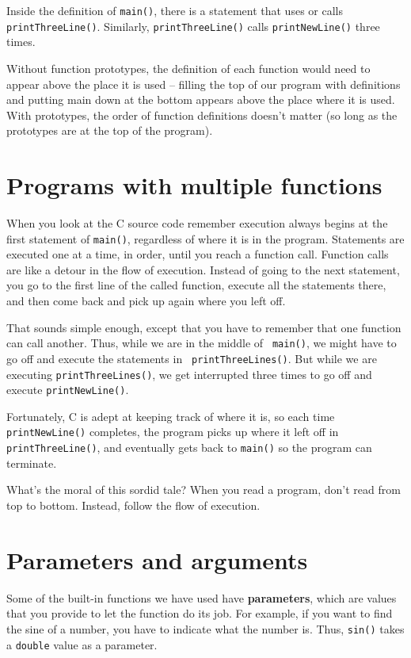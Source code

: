 Inside the definition of {\tt main()}, there is a statement that
uses or calls {\tt printThreeLine()}.  Similarly, {\tt printThreeLine()} calls
{\tt printNewLine()} three times.  

Without function prototypes,  the definition of each
function would need to appear above the place it is used -- filling the 
top of our program with definitions and putting main down at the bottom appears above the place where it is used. 
With prototypes, the order of function definitions doesn't matter (so long as the prototypes are at the top of the program).


\section {Programs with multiple functions}

When you look at the C source code remember execution always begins at the first statement of {\tt main()},
regardless of where it is in the program.
Statements are executed one at a time, in order, until you reach a
function call.  Function calls are like a detour in the flow of
execution.  Instead of going to the next statement, you go to the
first line of the called function, execute all the statements there,
and then come back and pick up again where you left off.

That sounds simple enough, except that you have to remember that one
function can call another.  Thus, while we are in the middle of {\tt
main()}, we might have to go off and execute the statements in {\tt
printThreeLines()}.  But while we are executing {\tt printThreeLines()}, we get
interrupted three times to go off and execute {\tt printNewLine()}.

Fortunately, C is adept at keeping track of where it is, so
each time {\tt printNewLine()} completes, the program picks up where it left
off in {\tt printThreeLine()}, and eventually gets back to {\tt main()} so the
program can terminate.

What's the moral of this sordid tale?  When you read a program, don't
read from top to bottom.  Instead, follow the flow of execution.

\section {Parameters and arguments}

Some of the built-in functions we have used have {\bf parameters},
which are values that you provide to let the function do its
job.  For example, if you want to find the sine of a number,
you have to indicate what the number is.  Thus, {\tt sin()}
takes a {\tt double} value as a parameter.

